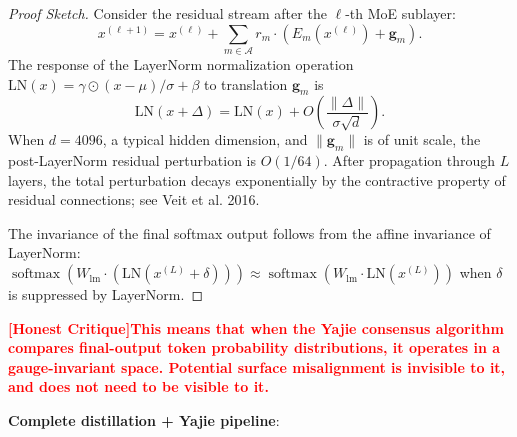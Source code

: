 \documentclass[12pt,a4paper]{article}
\theoremstyle{remark}
\DeclareMathOperator{\softmax}{softmax}
\newcommand{\honestcrit}[1]{%
    \textcolor{red}{\textbf{[Honest Critique]#1}}%
}
\begin{document}
\begin{proof}[Proof Sketch]
Consider the residual stream after the $\ell$-th MoE sublayer:
\begin{equation}
    x^{(\ell+1)} = x^{(\ell)} + \sum_{m \in \mathcal{A}} r_m \cdot (E_m(x^{(\ell)}) + \mathbf{g}_m).
\end{equation}
The response of the LayerNorm normalization operation $\text{LN}(x) = \gamma \odot (x - \mu)/\sigma + \beta$ to translation $\mathbf{g}_m$ is
\begin{equation}
    \text{LN}(x + \Delta) = \text{LN}(x) + O\left(\frac{\|\Delta\|}{\sigma\sqrt{d}}\right).
\end{equation}
When $d = 4096$, a typical hidden dimension, and $\|\mathbf{g}_m\|$ is of unit scale, the post-LayerNorm residual perturbation is $O(1/64)$. After propagation through $L$ layers, the total perturbation decays exponentially by the contractive property of residual connections; see Veit et al. 2016.

The invariance of the final softmax output follows from the affine invariance of LayerNorm: $\softmax(W_{\text{lm}} \cdot (\text{LN}(x^{(L)} + \delta))) \approx \softmax(W_{\text{lm}} \cdot \text{LN}(x^{(L)}))$ when $\delta$ is suppressed by LayerNorm.
\end{proof}

\honestcrit{This means that when the Yajie consensus algorithm compares final-output token probability distributions, it operates in a gauge-invariant space. Potential surface misalignment is invisible to it, and does not need to be visible to it.}

\textbf{Complete distillation + Yajie pipeline}:
\end{document}
